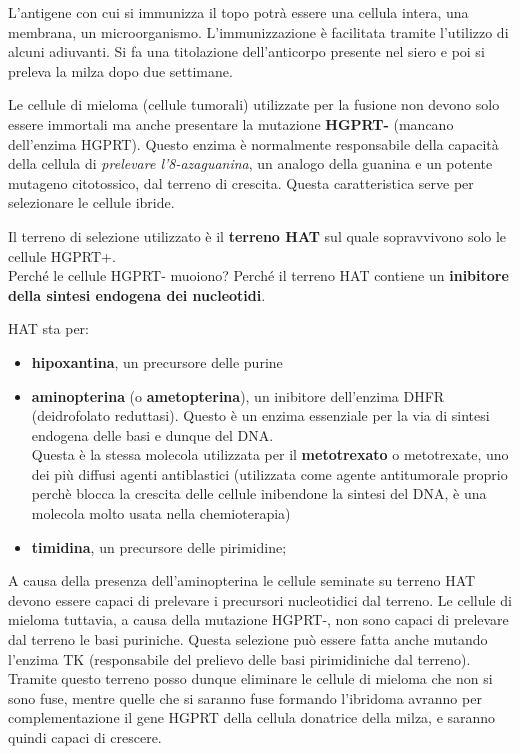 \documentclass[11pt]{book}
\begin{document}
L’antigene con cui si immunizza il topo potrà essere una cellula intera, una membrana, un microorganismo. L'immunizzazione è facilitata tramite l'utilizzo di alcuni adiuvanti. Si fa una titolazione dell’anticorpo presente nel siero e poi si preleva la milza dopo due settimane.

Le cellule di mieloma (cellule tumorali) utilizzate per la fusione non devono solo essere immortali ma anche presentare la mutazione \textbf{HGPRT-} (mancano dell’enzima HGPRT). Questo enzima è normalmente responsabile della capacità della cellula di \emph{prelevare l’8-azaguanina}, un analogo della guanina e un potente mutageno citotossico, dal terreno di crescita. Questa caratteristica serve per selezionare le cellule ibride.

Il terreno di selezione utilizzato è il \textbf{terreno HAT} sul quale sopravvivono solo le cellule HGPRT+.\\
Perché le cellule HGPRT- muoiono? Perché il terreno HAT contiene un \textbf{inibitore della sintesi endogena dei nucleotidi}. 

HAT sta per:
\begin{itemize}
\item \textbf{hipoxantina}, un precursore delle purine
\item \textbf{aminopterina} (o \textbf{ametopterina}), un inibitore dell'enzima DHFR (deidrofolato reduttasi). Questo è un enzima essenziale per la via di sintesi endogena delle basi e dunque del DNA.\\
Questa è la stessa molecola utilizzata per il \textbf{metotrexato} o metotrexate, uno dei più diffusi agenti antiblastici (utilizzata come agente antitumorale proprio perchè blocca la crescita delle cellule inibendone la sintesi del DNA, è una molecola molto usata nella chemioterapia)
\item \textbf{timidina}, un precursore delle pirimidine; 
\end{itemize}

A causa della presenza dell'aminopterina le cellule seminate su terreno HAT devono essere capaci di prelevare i precursori nucleotidici dal terreno. Le cellule di mieloma tuttavia, a causa della mutazione HGPRT-, non sono capaci di prelevare dal terreno le basi puriniche. Questa selezione può essere fatta anche mutando l'enzima TK (responsabile del prelievo delle basi pirimidiniche dal terreno).\\
Tramite questo terreno posso dunque eliminare le cellule di mieloma che non si sono fuse, mentre quelle che si saranno fuse formando l’ibridoma avranno per complementazione il gene HGPRT della cellula donatrice della milza, e saranno quindi capaci di crescere.
\end{document}
